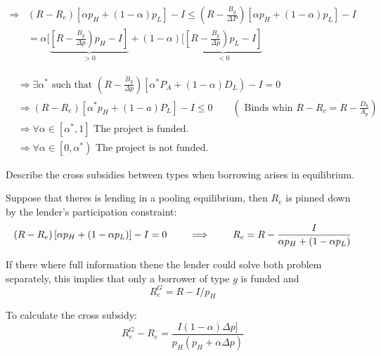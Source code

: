 \documentclass[12pt]{article}
\begin{document}
\begin{answer}
        \begin{align*}
        \Rightarrow& \left(R-R_{e}\right)\left[\alpha p_H+(1-\alpha) p_L\right]-I \leqslant\left(R-\frac{B_{g}}{\Delta P}\right)\left[\alpha p_H+(1-\alpha) p_L\right]-I \\
        &=\alpha[\underbrace{\left.\left[R-\frac{B_{g}}{\Delta p}\right) p_H-I\right]}_{>0}+(1-\alpha)[\underbrace{\left.\left[R-\frac{B_{g}}{\Delta{p}}\right) p_L-I\right]}_{< 0}
        \end{align*}

        \begin{align*}
            &\Rightarrow \exists \alpha^{*} \text { such that }\left(R-\frac{B_{g}}{\Delta p}\right)\left[\alpha^{*} P_{A}+(1-\alpha) D_{L}\right)-I=0 \\
            &\Rightarrow\left(R-R_{e}\right)\left[\alpha^* p_{H}+(1-a) P_{L}\right]-I \leq 0 \qquad \left(\text { Binds whin } R-R_{c}=R-\frac{D_{8}}{A_{p}}\right) \\
            &\Rightarrow \forall \alpha \in\left[\alpha^{*},1 \right] \text { The project is funded. } \\
            &\Rightarrow \forall \alpha \in\left[0, \alpha^{*}\right) \text { The project is not funded. }
        \end{align*}

    \end{answer}

    \begin{subexercise}
        Describe the cross subsidies between types when borrowing arises in equilibrium.
    \end{subexercise}
    \begin{answer}
        Suppose that theres is lending in a pooling equilibrium, then $R_e$ is pinned down by the lender's participation constraint:
        $$ (R - R_e) \left[ \alpha p_H + (1-\alpha p_L)\right] - I = 0 \qquad \implies \qquad R_e = R - \frac{I}{\alpha p_H + (1-\alpha p_L)} $$

        If there where full information thene the lender could solve both problem separately, this implies that only a borrower of type $g$ is funded and $$R^G_e = R - I / p_H$$

        To calculate the cross subsidy:
        $$R^G_e - R_e = \frac{I(1-\alpha)\Delta p]}{p_H(p_H +  \alpha \Delta p ) }$$
    \end{answer} 
    
\end{document}
